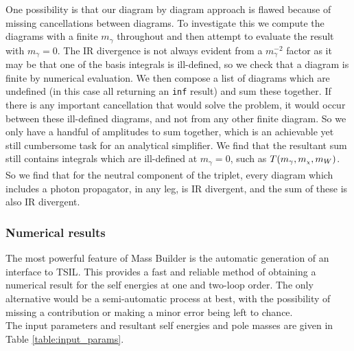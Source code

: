 \documentclass[11pt]{article}
\newcommand{\mychi}{\raisebox{0pt}[1ex][1ex]{\tiny$\chi$}}
\def\mc{m_{\mychi}}
\newcommand{\mb}{\textsf{Mass Builder} }
\newcommand{\tsils}{\textsf{TSIL}}
\begin{document}
One possibility is that our diagram by diagram approach is flawed because of missing cancellations between diagrams.  To investigate this we compute the diagrams with a finite $m_{\gamma}$ throughout and then attempt to evaluate the result with $m_{\gamma}=0$.  The IR divergence is not always evident from a $m_{\gamma}^{-2}$ factor as it may be that one of the basis integrals is ill-defined, so we check that a diagram is finite by numerical evaluation.  We then compose a list of diagrams which are undefined (in this case all returning an \lstinline{inf} result) and sum these together.  If there is any important cancellation that would solve the problem, it would occur between these ill-defined diagrams, and not from any other finite diagram.  So we only have a handful of amplitudes to sum together, which is an achievable yet still cumbersome task for an analytical simplifier.  We find that the resultant sum still contains integrals which are ill-defined at $m_{\gamma}=0$, such as $T(m_{\gamma},\mc,m_W)$.\\

So we find that for the neutral component of the triplet, every diagram which includes a photon propagator, in any leg, is IR divergent, and the sum of these is also IR divergent.


\subsubsection{Numerical results}

The most powerful feature of \mb is the automatic generation of an interface to \tsils.  This provides a fast and reliable method of obtaining a numerical result for the self energies at one and two-loop order.  The only alternative would be a semi-automatic process at best, with the possibility of missing a contribution or making a minor error being left to chance.\\

The input parameters and resultant self energies and pole masses are given in Table \ref{table:input_params}.
\end{document}
